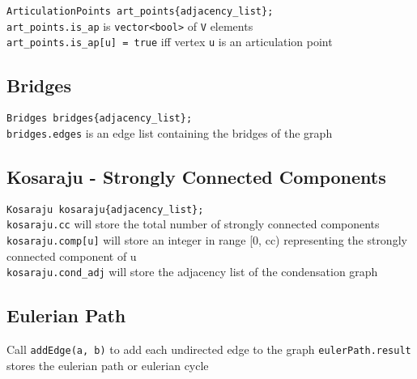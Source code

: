 \verb|ArticulationPoints art_points{adjacency_list};| \\
\verb|art_points.is_ap| is \verb|vector<bool>| of \verb|V| elements \\
\verb|art_points.is_ap[u] = true| iff vertex \verb|u| is an articulation point


\subsection{Bridges}

\verb|Bridges bridges{adjacency_list};| \\
\verb|bridges.edges| is an edge list containing the bridges of the graph


\subsection{Kosaraju - Strongly Connected Components}

\verb|Kosaraju kosaraju{adjacency_list};| \\
\verb|kosaraju.cc| will store the total number of strongly connected components \\
\verb|kosaraju.comp[u]| will store an integer in range [0, cc) representing the strongly connected component of u \\
\verb|kosaraju.cond_adj| will store the adjacency list of the condensation graph

\subsection{Eulerian Path}
Call \verb|addEdge(a, b)| to add each undirected edge to the graph
\verb|eulerPath.result| stores the eulerian path or eulerian cycle
